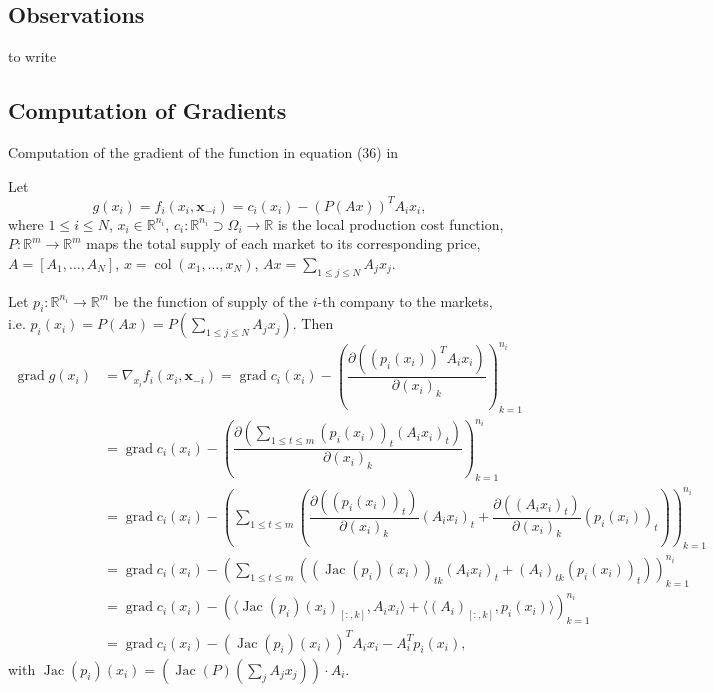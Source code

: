 
\subsection*{Observations}

to write

\subsection*{Computation of Gradients}

Computation of the gradient of the function in equation (36) in \citep{Yi_2019}

Let
$$g(x_i) = f_i(x_i, \mathbf{x}_{-i}) = c_i(x_i) - (P(Ax))^T A_ix_i,$$
where $1 \leqslant i \leqslant N$, $x_i \in \mathbb{R}^{n_i}$, $c_i: \mathbb{R}^{n_i} \supset \Omega_i \to \mathbb{R}$ is the local production cost function, $P: \mathbb{R}^m \to \mathbb{R}^m$ maps the total supply of each market to its corresponding price, $A = [A_1, \ldots, A_N]$, $x = \operatorname{col}(x_1, \ldots, x_N)$, $Ax = \sum\limits_{1 \leqslant j \leqslant N} A_jx_j$. 

Let $p_i: \mathbb{R}^{n_i} \to \mathbb{R}^m$ be the function of supply of the $i$-th company to the markets, i.e. $p_i(x_i) = P(Ax) = P\left(\sum\limits_{1 \leqslant j \leqslant N} A_jx_j\right)$. Then
\begin{align*}
\operatorname{grad} g(x_i) & = \nabla_{x_i} f_i(x_i, \mathbf{x}_{-i}) = \operatorname{grad} c_i(x_i) - \left( \dfrac{\partial \left( (p_i(x_i))^T A_ix_i \right)}{\partial (x_i)_k} \right)_{k=1}^{n_i} \\
& = \operatorname{grad} c_i(x_i) - \left( \dfrac{\partial \left( \sum\limits_{1\leqslant t \leqslant m} (p_i(x_i))_t (A_ix_i)_t \right)}{\partial (x_i)_k} \right)_{k=1}^{n_i} \\
& = \operatorname{grad} c_i(x_i) - \left( \sum\limits_{1\leqslant t \leqslant m}\left( \dfrac{\partial \left( (p_i(x_i))_t \right)}{\partial (x_i)_k} (A_ix_i)_t + \dfrac{\partial \left( (A_ix_i)_t \right)}{\partial (x_i)_k} (p_i(x_i))_t \right) \right)_{k=1}^{n_i} \\
& = \operatorname{grad} c_i(x_i) - \left( \sum\limits_{1\leqslant t \leqslant m}\left( \left(\operatorname{Jac} (p_i)(x_i) \right)_{tk} (A_ix_i)_t + (A_i)_{tk} (p_i(x_i))_t \right) \right)_{k=1}^{n_i} \\
& = \operatorname{grad} c_i(x_i) - \left( \langle \operatorname{Jac}(p_i)(x_i)_{[:,k]}, A_ix_i \rangle + \langle (A_i)_{[:,k]}, p_i(x_i) \rangle \right)_{k=1}^{n_i} \\
& =\operatorname{grad} c_i(x_i) - \left( \operatorname{Jac}(p_i)(x_i) \right)^T A_ix_i - A_i^T p_i(x_i),
\end{align*}
with $\operatorname{Jac}(p_i)(x_i) = \left( \operatorname{Jac}(P)\left(\sum\limits_j A_jx_j\right) \right) \cdot A_i$.

